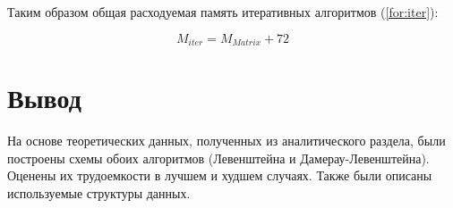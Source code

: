 Таким образом общая расходуемая память итеративных алгоритмов (\ref{for:iter}):

\begin{equation}
M_{iter} = M_{Matrix} + 72
\label{for:iter}
\end{equation}



\section*{Вывод}
На основе теоретических данных, полученных из аналитического раздела, были построены схемы обоих алгоритмов (Левенштейна и Дамерау-Левенштейна). Оценены их трудоемкости в лучшем и худшем случаях. Также были описаны используемые структуры данных.






